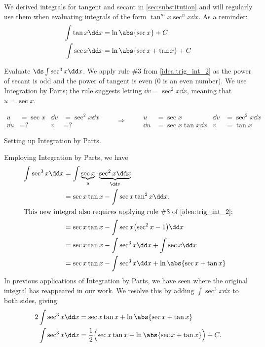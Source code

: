 We derived integrals for tangent and secant in \autoref{sec:substitution} and will regularly use them when evaluating integrals of the form $\tan^m x \sec^n x \dd x$.  As a reminder:
\begin{align*}
 \int\tan x\dd x &=\ln\abs{\sec x}+C \\
 \int\sec x\dd x &=\ln\abs{\sec x+\tan x}+C
\end{align*}

\begin{example}\label{ex_trigint6}%
Evaluate $\ds\int \sec^3x\dd x$.
\solution
We apply rule \#3 from \autoref{idea:trig_int_2} as the power of secant is odd and the power of tangent is even (0 is an even number). We use Integration by Parts; the rule suggests letting $\dd v = \sec^2x\dd x$, meaning that $u = \sec x$. \\
\noindent\begin{minipage}[t]{\linewidth}\noindent%
\captionsetup{type=figure}%
\[
\begin{aligned}
u&= \sec x & \dd v&=\sec^2 x\dd x\\
\dd u&= \text{?} & v&=\text{?}
\end{aligned}
\qquad\Rightarrow\qquad
\begin{aligned}
u&= \sec x & \dd v&=\sec^2 x\dd x\\
\dd u&= \sec x\tan x\dd x & v&=\tan x
\end{aligned}
\]
\caption{Setting up Integration by Parts.}\label{fig:trigint1}
\end{minipage}

Employing Integration by Parts, we have
\begin{align*}
\int \sec^3x\dd x
 	&=	\int \underbrace{\sec x}_u\cdot\underbrace{\sec^2 x\dd x}_{\dd v}\\
	&=	\sec x\tan x - \int \sec x\tan^2x\dd x. \\
\intertext{This new integral also requires applying rule \#3 of \autoref{idea:trig_int_2}:}
	&= \sec x\tan x - \int \sec x \bigl(\sec^2 x-1\bigr)\dd x\\
	&=	\sec x\tan x - \int \sec^3x\dd x + \int \sec x\dd x \\
	&= \sec x\tan x -\int \sec^3x\dd x + \ln\abs{\sec x+\tan x}
\end{align*}
%
%
In previous applications of Integration by Parts, we have seen where the original integral has reappeared in our work. We resolve this by adding $\int \sec^3x\dd x$ to both sides, giving:
\begin{align*}
2\int \sec^3x\dd x &= \sec x\tan x + \ln\abs{\sec x+\tan x} \\
\int \sec^3x\dd x &= \frac12\Bigl(\sec x\tan x + \ln\abs{\sec x+\tan x}\Bigr)+C.
\end{align*}
\end{example}

